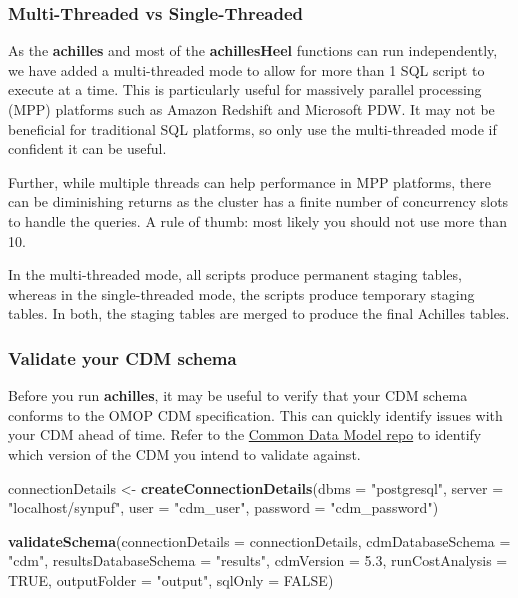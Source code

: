\documentclass[]{article}
\newenvironment{Shaded}{\begin{snugshade}}{\end{snugshade}}
\newcommand{\KeywordTok}[1]{\textcolor[rgb]{0.13,0.29,0.53}{\textbf{#1}}}
\newcommand{\DataTypeTok}[1]{\textcolor[rgb]{0.13,0.29,0.53}{#1}}
\newcommand{\FloatTok}[1]{\textcolor[rgb]{0.00,0.00,0.81}{#1}}
\newcommand{\StringTok}[1]{\textcolor[rgb]{0.31,0.60,0.02}{#1}}
\newcommand{\OtherTok}[1]{\textcolor[rgb]{0.56,0.35,0.01}{#1}}
\newcommand{\NormalTok}[1]{#1}
\begin{document}
\subsubsection{Multi-Threaded vs
Single-Threaded}\label{multi-threaded-vs-single-threaded}

As the \textbf{achilles} and most of the \textbf{achillesHeel} functions
can run independently, we have added a multi-threaded mode to allow for
more than 1 SQL script to execute at a time. This is particularly useful
for massively parallel processing (MPP) platforms such as Amazon
Redshift and Microsoft PDW. It may not be beneficial for traditional SQL
platforms, so only use the multi-threaded mode if confident it can be
useful.

Further, while multiple threads can help performance in MPP platforms,
there can be diminishing returns as the cluster has a finite number of
concurrency slots to handle the queries. A rule of thumb: most likely
you should not use more than 10.

In the multi-threaded mode, all scripts produce permanent staging
tables, whereas in the single-threaded mode, the scripts produce
temporary staging tables. In both, the staging tables are merged to
produce the final Achilles tables.

\subsubsection{Validate your CDM schema}\label{validate-your-cdm-schema}

Before you run \textbf{achilles}, it may be useful to verify that your
CDM schema conforms to the OMOP CDM specification. This can quickly
identify issues with your CDM ahead of time. Refer to the
\href{https://github.com/OHDSI/CommonDataModel}{Common Data Model repo}
to identify which version of the CDM you intend to validate against.

\begin{Shaded}
\begin{Highlighting}[]
\NormalTok{connectionDetails <-}\StringTok{ }\KeywordTok{createConnectionDetails}\NormalTok{(}\DataTypeTok{dbms =} \StringTok{"postgresql"}\NormalTok{, }
                                             \DataTypeTok{server =} \StringTok{"localhost/synpuf"}\NormalTok{, }
                                             \DataTypeTok{user =} \StringTok{"cdm_user"}\NormalTok{, }
                                             \DataTypeTok{password =} \StringTok{"cdm_password"}\NormalTok{)}

\KeywordTok{validateSchema}\NormalTok{(}\DataTypeTok{connectionDetails =}\NormalTok{ connectionDetails, }
               \DataTypeTok{cdmDatabaseSchema =} \StringTok{"cdm"}\NormalTok{, }
               \DataTypeTok{resultsDatabaseSchema =} \StringTok{"results"}\NormalTok{, }
               \DataTypeTok{cdmVersion =} \FloatTok{5.3}\NormalTok{, }
               \DataTypeTok{runCostAnalysis =} \OtherTok{TRUE}\NormalTok{, }
               \DataTypeTok{outputFolder =} \StringTok{"output"}\NormalTok{, }
               \DataTypeTok{sqlOnly =} \OtherTok{FALSE}\NormalTok{)}
\end{Highlighting}
\end{Shaded}
\end{document}
